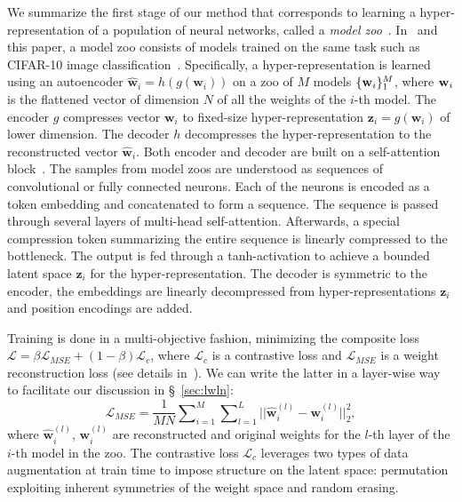 \documentclass{article}
\begin{document}
We summarize the first stage of our method that corresponds to learning a hyper-representation of a population of neural networks, called a \textit{model zoo}~\citep{schurholtSelfSupervisedRepresentationLearning2021}. In~\citep{schurholtSelfSupervisedRepresentationLearning2021} and this paper, a model zoo consists of models trained on the same task such as CIFAR-10 image classification~\citep{krizhevskyLearningMultipleLayers2009}.
%
Specifically, a hyper-representation is learned using an autoencoder $\hat{\mathbf{w}}_i = h(g(\mathbf{w}_i))$ on a zoo of $M$ models $\{ {\bf w}_i\}_1^M$, 
where ${\bf w}_i$ is the flattened vector of dimension $N$ of all the weights of the $i$-th model. 
The encoder $g$ compresses vector $\mathbf{w}_i$ to fixed-size hyper-representation $\mathbf{z}_i=g(\mathbf{w}_i)$ of lower dimension. The decoder $h$ decompresses the hyper-representation to the reconstructed vector $\hat{\mathbf{w}}_i$. Both encoder and decoder are built on a self-attention block~\citep{vaswaniAttentionAllYou2017}. The samples from model zoos are understood as sequences of convolutional or fully connected neurons. Each of the neurons is encoded as a token embedding and concatenated to form a sequence. 
The sequence is passed through several layers of multi-head self-attention. Afterwards, a special compression token summarizing the entire sequence is linearly compressed to the bottleneck. The output is fed through a tanh-activation to achieve a bounded latent space $\mathbf{z}_i$ for the hyper-representation. The decoder is symmetric to the encoder, the embeddings are linearly decompressed from hyper-representations $\mathbf{z}_i$ and position encodings are added.

Training is done in a multi-objective fashion, minimizing the composite loss $\mathcal{L} = \beta \mathcal{L}_{MSE}+(1-\beta)\mathcal{L}_{c}$, where
$\mathcal{L}_{c}$ is a contrastive loss and $\mathcal{L}_{MSE}$ is a weight reconstruction loss (see details in~\citep{schurholtSelfSupervisedRepresentationLearning2021}). We can write the latter in a layer-wise way to facilitate our discussion in \S~\ref{sec:lwln}:
%
\begin{equation}
    \label{eq:baseline_loss}
    \mathcal{L}_{MSE} = \frac{1}{MN}\sum\nolimits_{i=1}^M \sum\nolimits_{l=1}^L || \hat{\mathbf{w}}^{(l)}_i - {\mathbf{w}}^{(l)}_i ||^2_2,
\end{equation}
%
\noindent where $\hat{\mathbf{w}}^{(l)}_i$, ${\mathbf{w}}^{(l)}_i$ are reconstructed and original weights for the $l$-{th} layer of the $i$-{th} model in the zoo. %
The contrastive loss $\mathcal{L}_{c}$ leverages two types of data augmentation at train time to impose structure on the latent space: permutation exploiting inherent symmetries of the weight space and random erasing.
\end{document}

